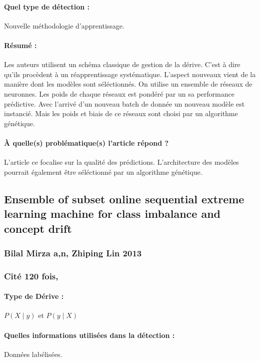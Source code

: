 \documentclass[11pt,a4paper]{report}
\begin{document}
\paragraph{Quel type de détection :} Nouvelle méthodologie d'apprentissage.

\paragraph{Résumé :} Les auteurs utilisent un schéma classique de gestion de la dérive. C'est à dire qu'ils procèdent à un réapprentissage systématique. L'aspect nouveaux vient de la manière dont les modèles sont séléctionnés. On utilise un ensemble de réseaux de neuronnes. Les poids de chaque réseaux est pondéré par un sa performance prédictive. Avec l'arrivé d'un nouveau batch de donnée un nouveau modèle est instancié. Mais les poids et biais de ce réseaux sont choisi par un algorithme génétique.

\paragraph{À quelle(s) problématique(s) l'article répond ?} L'article ce focalise sur la qualité des prédictions. L'architecture des modèles pourrait également être séléctionné par un algorithme génétique.







\subsection{Ensemble of subset online sequential extreme learning machine for class imbalance and concept drift}
\subsubsection{Bilal Mirza a,n, Zhiping Lin  2013}

\subsubsection{Cité 120 fois, }

\paragraph{Type de Dérive :} $P(X\mid y)$ et $P(y \mid X)$ 
\paragraph{Quelles informations utilisées dans la détection :} Données labélisées.
\end{document}
